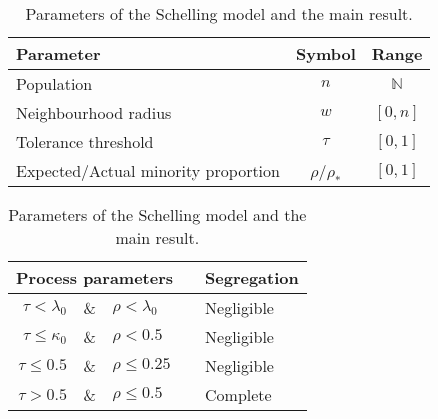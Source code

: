 \documentclass[11pt]{article}
\theoremstyle{plain}
\numberwithin{equation}{subsection}
\begin{document}
\begin{table}
\caption{Parameters of the Schelling model and the main result.}\label{ta:paraandmainres}
\colorbox{black!10}{
  \begin{tabular}{lcc}
{\bf\small  Parameter}&  
{\bf\small  Symbol} &{\bf\small  Range} \\[1ex]
\toprule
{\small Population} \hspace{0.0cm}   &	 {\small $n$} \hspace{0.0cm} &{\small $\mathbb{N}$}\\[1ex]
{\small Neighbourhood radius}    \hspace{0.0cm} & {\small $w$} \hspace{0.0cm} &{\small $[0,n]$}\\[1ex]
 {\small Tolerance threshold}	 \hspace{0.0cm}  &   {\small $\tau$} \hspace{0.0cm} &{\small $[0,1]$}\\[1ex]
{\small Expected/Actual minority proportion}  \hspace{0.0cm}  &  {\small $\rho$/$\rho_{\ast}$}
\hspace{0.0cm}  & {\small $[0, 1]$}\\[1ex]
\end{tabular}}
\quad
\colorbox{black!10}{
 \begin{tabular}{rclcl}
\multicolumn{3}{c}{\bf\small  Process parameters}  & & {\bf\small  Segregation}  \\[1ex]
\toprule
{\small $\tau< \lambda_0$ \hspace{0.1cm}}&{\small\&\hspace{0.2cm}}&
{\small $\rho< \lambda_0$} & \hspace{0.0cm}  & {\small Negligible}\\[1ex]
{\small $\tau\leq \kappa_0$ \hspace{0.1cm}}&{\small\&\hspace{0.2cm}}&
{\small $\rho< 0.5$} & \hspace{0.0cm}  & {\small Negligible}\\[1ex]
{\small $\tau\leq 0.5$}\hspace{0.1cm} &{\small\&\hspace{0.2cm}}& 
{\small $\rho\leq 0.25$} &	\hspace{0.0cm}  & {\small Negligible}\\[1ex]
{\small $\tau> 0.5$}\hspace{0.1cm} &{\small\&\hspace{0.2cm}}&
{\small $\rho \leq 0.5$} &	\hspace{0.0cm}  & {\small Complete}
\end{tabular}} 
\centering
\end{table}
\end{document}
